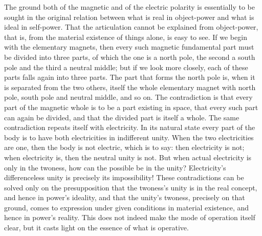 \documentclass[12pt,a4paper]{book}
\begin{document}
The ground both of the magnetic and of the electric polarity is essentially to be sought in the original relation between
what is real in object-power and what is ideal in self-power. That the articulation cannot be explained from object-power,
that is, from the material existence of things alone, is easy to see. If we begin with the elementary magnets, then every
such magnetic fundamental part must be divided into three parts, of which the one is a north pole, the second a south
pole and the third a neutral middle; but if we look more closely, each of these parts falls again into three parts. The
part that forms the north pole is, when it is separated from the two others, itself the whole elementary magnet with
north pole, south pole and neutral middle, and so on. The contradiction is that every part of the magnetic whole is to be
a part existing in space, that every such part can again be divided, and that the divided part is itself a whole. The
same contradiction repeats itself with electricity. In its natural state every part of the body is to have both
electricities in indifferent unity. When the two electricities are one, then the body is not electric, which is to say:
then electricity is not; when electricity is, then the neutral unity is not. But when actual electricity is only in the
twoness, how can the possible be in the unity? Electricity's differenceless unity is precisely its impossibility! These
contradictions can be solved only on the presupposition that the twoness's unity is in the real concept, and hence in
power's ideality, and that the unity's twoness, precisely on that ground, comes to expression under given conditions in
material existence, and hence in power's reality. This does not indeed make the mode of operation itself clear, but it
casts light on the essence of what is operative.
\end{document}
